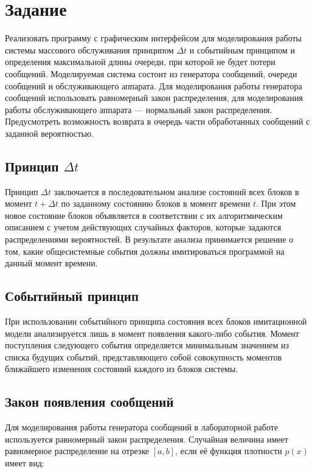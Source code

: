 \chapter{Задание}

Реализовать программу с графическим интерфейсом для моделирования работы системы массового обслуживания принципом $\Delta t$ и событийным принципом и определения максимальной длины очереди, при которой не будет потери сообщений. Моделируемая система состоит из генератора сообщений, очереди сообщений и обслуживающего аппарата. Для моделирования работы генератора сообщений использовать равномерный закон распределения, для моделирования работы обслуживающего аппарата --- нормальный закон распределения. Предусмотреть возможность возврата в очередь части обработанных сообщений с заданной вероятностью.

\section{Принцип $\Delta t$}

Принцип $\Delta t$ заключается в последовательном анализе состояний всех блоков в момент $t + \Delta t$ по заданному состоянию блоков в момент времени $t$. При этом новое состояние блоков объявляется в соответствии с их алгоритмическим описанием с учетом действующих случайных факторов, которые задаются распределениями вероятностей. В результате анализа принимается решение о том, какие общесистемные события должны имитироваться программой на данный момент времени.

\section{Событийный принцип}

При использовании событийного принципа состояния всех блоков имитационной модели анализируется лишь в момент появления какого-либо события. Момент поступления следующего события определяется минимальным значением из списка будущих событий, представляющего собой совокупность моментов ближайшего изменения состояний каждого из блоков системы.

\section{Закон появления сообщений}

Для моделирования работы генератора сообщений в лабораторной работе используется равномерный закон распределения. Случайная величина имеет равномерное распределение на отрезке $[a, b]$, если её функция плотности $p(x)$ имеет вид:

